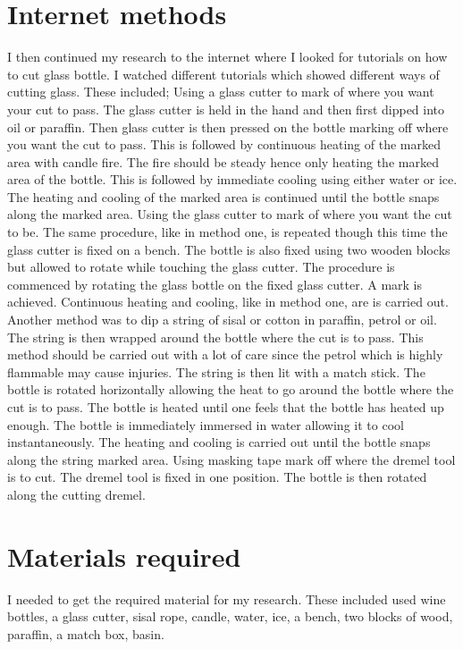 \documentclass[12pt]{article}
\begin{document}
\section{Internet methods}
I then continued my research to the internet where I looked for tutorials on how to cut glass bottle. I watched different tutorials which showed different ways of cutting glass. These included;
Using a glass cutter to mark of where you want your cut to pass. The glass cutter is held in the hand and then first dipped into oil or paraffin. Then glass cutter is then pressed on the bottle marking off where you want the cut to pass. This is followed by continuous heating of the marked area with candle fire. The fire should be steady hence only heating the marked area of the bottle. This is followed by immediate cooling using either water or ice. The heating and cooling of the marked area is continued until the bottle snaps along the marked area.
Using the glass cutter to mark of where you want the cut to be. The same procedure, like in method one, is repeated though this time the glass cutter is fixed on a bench. The bottle is also fixed using two wooden blocks but allowed to rotate while touching the glass cutter. The procedure is commenced by rotating the glass bottle on the fixed glass cutter. A mark is achieved. Continuous heating and cooling, like in method one, are is carried out.
Another method was to dip a string of sisal or cotton in paraffin, petrol or oil. The string is then wrapped around the bottle where the cut is to pass. This method should be carried out with a lot of care since the petrol which is highly flammable may cause injuries. The string is then lit with a match stick. The bottle is rotated horizontally allowing the heat to go around the bottle where the cut is to pass. The bottle is heated until one feels that the bottle has heated up enough. The bottle is immediately immersed in water allowing it to cool instantaneously. The heating and cooling is carried out until the bottle snaps along the string marked area.
Using masking tape mark off where the dremel tool is to cut. The dremel tool is fixed in one position. The bottle is then rotated along the cutting dremel.

\section{Materials required}
I needed to get the required material for my research. These included used wine bottles, a glass cutter, sisal rope, candle, water, ice, a bench, two blocks of wood, paraffin, a match box, basin.
\end{document}
